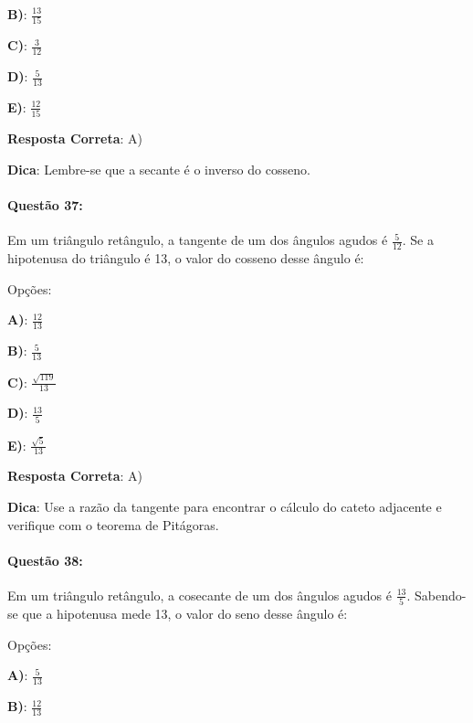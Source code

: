 \documentclass{article}
\begin{document}
\textbf{B)}: \( \frac{13}{15} \) 

\textbf{C)}: \( \frac{3}{12} \) 

\textbf{D)}: \( \frac{5}{13} \) 

\textbf{E)}: \( \frac{12}{15} \) 

\vspace{\baselineskip}\textbf{Resposta Correta}: A)

\vspace{\baselineskip}\textbf{Dica}: Lembre-se que a secante é o inverso do cosseno.

\paragraph{Questão 37:}
{Em um triângulo retângulo, a tangente de um dos ângulos agudos é \( \frac{5}{12} \). Se a hipotenusa do triângulo é 13, o valor do cosseno desse ângulo é:}

\vspace{\baselineskip}Opções:

\vspace{\baselineskip}\textbf{A)}: \( \frac{12}{13} \) 

\textbf{B)}: \( \frac{5}{13} \) 

\textbf{C)}: \( \frac{\sqrt{119}}{13} \) 

\textbf{D)}: \( \frac{13}{5} \) 

\textbf{E)}: \( \frac{\sqrt{5}}{13} \) 

\vspace{\baselineskip}\textbf{Resposta Correta}: A)

\vspace{\baselineskip}\textbf{Dica}: Use a razão da tangente para encontrar o cálculo do cateto adjacente e verifique com o teorema de Pitágoras.

\paragraph{Questão 38:}
{Em um triângulo retângulo, a cosecante de um dos ângulos agudos é \( \frac{13}{5} \). Sabendo-se que a hipotenusa mede 13, o valor do seno desse ângulo é:}

\vspace{\baselineskip}Opções:

\vspace{\baselineskip}\textbf{A)}: \( \frac{5}{13} \) 

\textbf{B)}: \( \frac{12}{13} \) 
\end{document}
